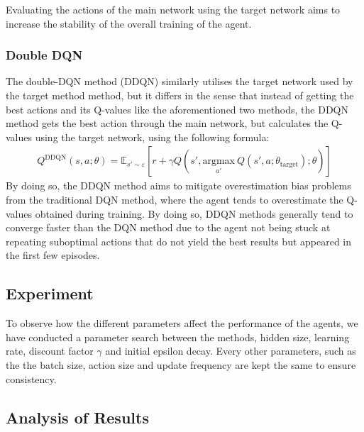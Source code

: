 Evaluating the actions of the main network using the target network aims to increase the stability of the overall training of the agent.

\subsubsection{Double DQN}
The double-DQN method (DDQN) similarly utilises the target network used by the target method method, but it differs in the sense that instead of getting the best actions and its Q-values like the aforementioned two methods, the DDQN method gets the best action through the main network, but calculates the Q-values using the target network, using the following formula:
\begin{align*}
    Q^{\text{DDQN}}(s, a ; \theta) = \mathbb{E}_{s' \sim \varepsilon}[r + \gamma Q(s', \underset{a'}{\text{argmax}}\ Q(s', a ; \theta_{\text{target}}) ; \theta)]
\end{align*}
By doing so, the DDQN method aims to mitigate overestimation bias problems from the traditional DQN method, where the agent tends to overestimate the Q-values obtained during training. By doing so, DDQN methods generally tend to converge faster than the DQN method due to the agent not being stuck at repeating suboptimal actions that do not yield the best results but appeared in the first few episodes.

\subsection{Experiment}
To observe how the different parameters affect the performance of the agents, we have conducted a parameter search between the methods, hidden size, learning rate, discount factor $\gamma$ and initial epsilon decay. Every other parameters, such as the the batch size, action size and update frequency are kept the same to ensure consistency. 

\subsection{Analysis of Results}

